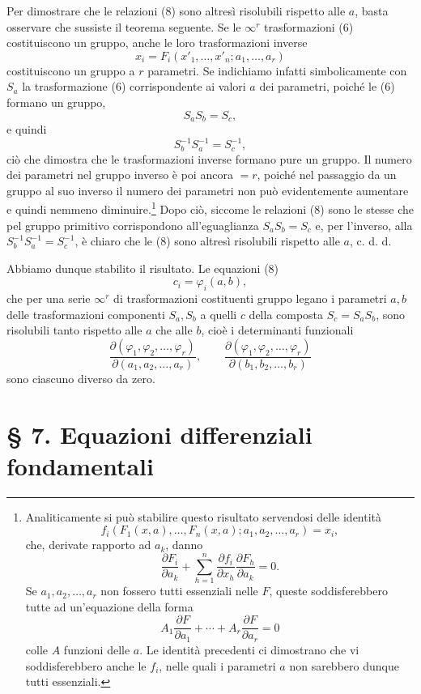 \documentclass[11pt]{book}
\begin{document}
Per dimostrare che le relazioni (8) sono altresì risolubili rispetto alle $a$, basta osservare che sussiste il teorema seguente. Se le $\infty^r$ trasformazioni (6) costituiscono un gruppo, anche le loro trasformazioni inverse
\[
 x_i=F_i(x'_1,\ldots,x'_n;a_1,\ldots,a_r)
\]
costituiscono un gruppo a $r$ parametri. Se indichiamo infatti simbolicamente con $S_a$ la trasformazione (6) corrispondente ai valori $a$ dei parametri, poiché le (6) formano un gruppo,
\[
 S_aS_b=S_c,
\]
e quindi
\[
 S_b^{-1}S_a^{-1}=S_c^{-1},
\]
ciò che dimostra che le trasformazioni inverse formano pure un gruppo. Il numero dei parametri nel gruppo inverso è poi ancora $=r$, poiché nel passaggio da un gruppo al suo inverso il numero dei parametri non può evidentemente aumentare e quindi nemmeno diminuire.\footnote{Analiticamente si può stabilire questo risultato servendosi delle identità
\[
 f_i(F_1(x,a),\ldots,F_n(x,a);a_1,a_2,\ldots,a_r)=x_i,
\]
che, derivate rapporto ad $a_k$, danno
\[
 \frac{\partial F_i}{\partial a_k}+\sum\limits_{h=1}^n\frac{\partial f_i}{\partial x_h}\frac{\partial F_h}{\partial a_k}=0.
\]
Se $a_1,a_2,\ldots,a_r$ non fossero tutti essenziali nelle $F$, queste soddisferebbero tutte ad un'equazione della forma
\[
 A_1\frac{\partial F}{\partial a_1}+\cdots+A_r\frac{\partial F}{\partial a_r}=0
\]
colle $A$ funzioni delle $a$. Le identità precedenti ci dimostrano che vi soddisferebbero anche le $f_i$, nelle quali i parametri $a$ non sarebbero dunque tutti essenziali.}
Dopo ciò, siccome le relazioni (8) sono le stesse che pel gruppo primitivo corrispondono all'eguaglianza $S_aS_b=S_c$ e, per l'inverso, alla $S_b^{-1}S_a^{-1}=S_c^{-1}$, è chiaro che le (8) sono altresì risolubili rispetto alle $a$, c. d. d.

Abbiamo dunque stabilito il risultato. Le equazioni (8)
\[
 c_i=\varphi_i(a,b),
\]
che per una serie $\infty^r$ di trasformazioni costituenti gruppo legano i parametri $a,b$ delle trasformazioni componenti $S_a,S_b$ a quelli $c$ della composta $S_c=S_aS_b$, sono risolubili tanto rispetto alle $a$ che alle $b$, cioè i determinanti funzionali
\[
 \frac{\partial(\varphi_1,\varphi_2,\ldots,\varphi_r)}{\partial(a_1,a_2,\ldots,a_r)},
 \qquad
 \frac{\partial(\varphi_1,\varphi_2,\ldots,\varphi_r)}{\partial(b_1,b_2,\ldots,b_r)}
\]
sono ciascuno diverso da zero.


\section*{\S{} 7. Equazioni differenziali fondamentali}
\end{document}
